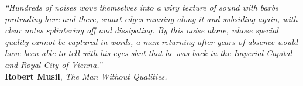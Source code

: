 \documentclass[final,twoside,11pt]{book}
\makeatletter
\numberwithin{equation}{section}
\numberwithin{figure}{chapter}
\numberwithin{table}{chapter}
\def\cleardoublepage{\clearpage\if@twoside \ifodd\c@page\else
  \hbox{}
  \thispagestyle{empty}
  \newpage
  \if@twocolumn\hbox{}\newpage\fi\fi\fi}
\makeatother
\begin{document}
\begin{flushright}
\begin{minipage}[t]{0.75\textwidth}



\linespread{0.97}\selectfont
{\itshape\small``Hundreds of noises wove themselves into a wiry texture of sound with barbs protruding here and there, smart edges running along it and subsiding again, with clear notes splintering off and dissipating. By this noise alone, whose special quality cannot be captured in words, a man returning after years of absence would have been able to tell with his eyes shut that he was back in the Imperial Capital and Royal City of Vienna.''}\\[-3mm]

{\cabincondensed\small\hfill \textbf{Robert Musil}, \emph{The Man Without Qualities.}}
\end{minipage}
\end{flushright}

\cleardoublepage

\tableofcontents
\cleardoublepage

\begingroup
{}
\setlength{\cftbeforefigskip}{2mm}
\setlength{\cftbeforetabskip}{2mm}
\renewcommand{\cftfigfont}{\small}
\renewcommand{\cfttabfont}{\small}
\renewcommand*{\addvspace}[1]{}
\listoffigures
\cleardoublepage

\listoftables
\cleardoublepage
\endgroup



\cleardoublepage

\mainmatter

\end{document}

